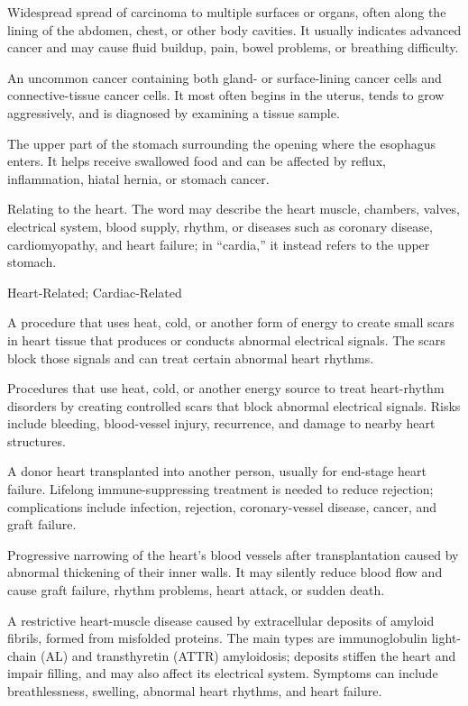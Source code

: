  Widespread spread of carcinoma to multiple surfaces or organs, often along the lining of the abdomen, chest, or other body cavities. It usually indicates advanced cancer and may cause fluid buildup, pain, bowel problems, or breathing difficulty.

 An uncommon cancer containing both gland- or surface-lining cancer cells and connective-tissue cancer cells. It most often begins in the uterus, tends to grow aggressively, and is diagnosed by examining a tissue sample.

 The upper part of the stomach surrounding the opening where the esophagus enters. It helps receive swallowed food and can be affected by reflux, inflammation, hiatal hernia, or stomach cancer.

 Relating to the heart. The word may describe the heart muscle, chambers, valves, electrical system, blood supply, rhythm, or diseases such as coronary disease, cardiomyopathy, and heart failure; in “cardia,” it instead refers to the upper stomach.

\synonyms
Heart-Related; Cardiac-Related

 A procedure that uses heat, cold, or another form of energy to create small scars in heart tissue that produces or conducts abnormal electrical signals. The scars block those signals and can treat certain abnormal heart rhythms.

 Procedures that use heat, cold, or another energy source to treat heart-rhythm disorders by creating controlled scars that block abnormal electrical signals. Risks include bleeding, blood-vessel injury, recurrence, and damage to nearby heart structures.

 A donor heart transplanted into another person, usually for end-stage heart failure. Lifelong immune-suppressing treatment is needed to reduce rejection; complications include infection, rejection, coronary-vessel disease, cancer, and graft failure.

 Progressive narrowing of the heart's blood vessels after transplantation caused by abnormal thickening of their inner walls. It may silently reduce blood flow and cause graft failure, rhythm problems, heart attack, or sudden death.

 A restrictive heart-muscle disease caused by extracellular deposits of amyloid fibrils,
formed from misfolded proteins. The main types are immunoglobulin light-chain (AL) and transthyretin (ATTR)
amyloidosis; deposits stiffen the heart and impair filling, and may also affect its electrical system. Symptoms can
include breathlessness, swelling, abnormal heart rhythms, and heart failure.

